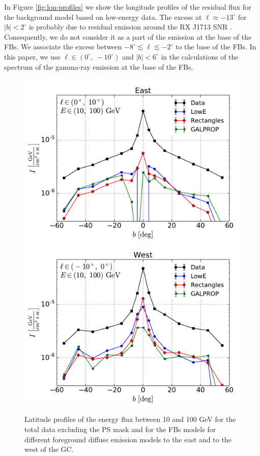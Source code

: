 In Figure \ref{fig:lon-profiles} we show the longitude profiles of the residual flux 
for the background model based on low-energy data.
The excess at $\ell \approx -13^\circ$ for $|b| < 2^\circ$ is probably due to residual emission around the RX J1713 SNR \citep{2011ApJ...734...28A}.
Consequently, we do not consider it as a part of the emission at the base of the FBs.
We associate the excess between $-8^\circ \lesssim \ell \lesssim -2^\circ$ to the base of the FBs. 
In this paper, we use $\ell \in (0^\circ,\ -10^\circ)$ and $|b| < 6^\circ$ in the calculations of the spectrum of the gamma-ray
emission at the base of the FBs.


\begin{figure}[h]
\centering
\includegraphics[width=\twopic\textwidth]{plots/Profiles_l=1_source_range_1.pdf}
\includegraphics[width=\twopic\textwidth]{plots/Profiles_l=0_source_range_1.pdf}
  	\caption{Latitude profiles of the energy flux between 10 and 100 GeV for the total data excluding the PS mask and for 
	the FBs models for different foreground diffuse emission models to the east and to the west of the GC.}
  	\label{fig:Profiles}
\end{figure}


